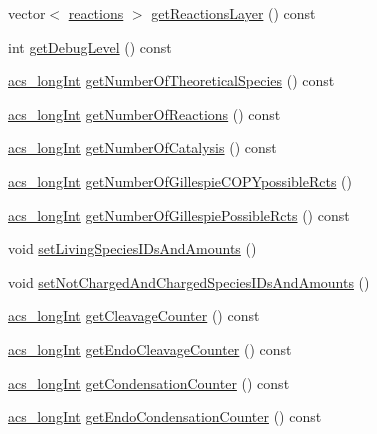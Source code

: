 \begin{DoxyCompactItemize}
\item 
vector$<$ \hyperlink{a00021}{reactions} $>$ \hyperlink{a00014_a3d44f3f4a8f9010fa99c49f5cc961416}{get\-Reactions\-Layer} () const 
\item 
int \hyperlink{a00014_a2de42381b0b9cba889bbb95c1456cfe5}{get\-Debug\-Level} () const 
\item 
\hyperlink{a00050_a19319d75f02db4308bc5c0026d98cd85}{acs\-\_\-long\-Int} \hyperlink{a00014_ab98d4ad28b101f08279aa3458d5dfda3}{get\-Number\-Of\-Theoretical\-Species} () const 
\item 
\hyperlink{a00050_a19319d75f02db4308bc5c0026d98cd85}{acs\-\_\-long\-Int} \hyperlink{a00014_abf45b6406f8c0e95c4c5edf6b374e112}{get\-Number\-Of\-Reactions} () const 
\item 
\hyperlink{a00050_a19319d75f02db4308bc5c0026d98cd85}{acs\-\_\-long\-Int} \hyperlink{a00014_a21609adb1a83a4cb7eaec78a90acd624}{get\-Number\-Of\-Catalysis} () const 
\item 
\hyperlink{a00050_a19319d75f02db4308bc5c0026d98cd85}{acs\-\_\-long\-Int} \hyperlink{a00014_a61d3f0644f40fb68be59bff6fad5176e}{get\-Number\-Of\-Gillespie\-C\-O\-P\-Ypossible\-Rcts} ()
\item 
\hyperlink{a00050_a19319d75f02db4308bc5c0026d98cd85}{acs\-\_\-long\-Int} \hyperlink{a00014_a3140242018e8232dfa89a127ac1bb282}{get\-Number\-Of\-Gillespie\-Possible\-Rcts} () const 
\item 
void \hyperlink{a00014_a4fb98d7cad06ef479e2643785231feb9}{set\-Living\-Species\-I\-Ds\-And\-Amounts} ()
\item 
void \hyperlink{a00014_ac5528a39937cdc76f0dd23c27542110c}{set\-Not\-Charged\-And\-Charged\-Species\-I\-Ds\-And\-Amounts} ()
\item 
\hyperlink{a00050_a19319d75f02db4308bc5c0026d98cd85}{acs\-\_\-long\-Int} \hyperlink{a00014_a8b9a3b5c5a2f86206c5fb124352e366e}{get\-Cleavage\-Counter} () const 
\item 
\hyperlink{a00050_a19319d75f02db4308bc5c0026d98cd85}{acs\-\_\-long\-Int} \hyperlink{a00014_aa2ded3c5ba8c4ce41ee86399dc616d4a}{get\-Endo\-Cleavage\-Counter} () const 
\item 
\hyperlink{a00050_a19319d75f02db4308bc5c0026d98cd85}{acs\-\_\-long\-Int} \hyperlink{a00014_a0fc62131bf552c2a995c7ddc461828cd}{get\-Condensation\-Counter} () const 
\item 
\hyperlink{a00050_a19319d75f02db4308bc5c0026d98cd85}{acs\-\_\-long\-Int} \hyperlink{a00014_aaa23d550cfa37344dd3bb4d5767e6ea0}{get\-Endo\-Condensation\-Counter} () const 
\item 

\end{DoxyCompactItemize}
